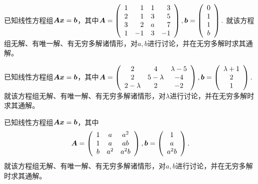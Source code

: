 \begin{frame}\ft{\subsecname}
  
    \begin{li}[2011-2012第二学期]
    已知线性方程组$\boldsymbol{A}{\boldsymbol{x}}={\boldsymbol{b}}$，其中$\boldsymbol{A}=\left(
    \begin{array}{rrrr}
        1&1&1&3\\
        2&1&3&5\\
        3&2&a&7\\
        1&-1&3&-1
      \end{array}
    \right),{\boldsymbol{b}}=\left(
      \begin{array}{c}
        0\\1\\1\\b
      \end{array}
      \right).$
      就该方程组无解、有唯一解、有无穷多解诸情形，对$a,b$进行讨论，并在无穷多解时求其通解。
    \end{li}

    \begin{li}[2012-2013第二学期]
    已知线性方程组$\boldsymbol{A}{\boldsymbol{x}}={\boldsymbol{b}}$，其中$\boldsymbol{A}=\left(
    \begin{array}{ccc}
        2&4&\lambda-5\\
        2&5-\lambda&-4\\
        2-\lambda&2&-2
      \end{array}
    \right),{\boldsymbol{b}}=\left(
      \begin{array}{c}
        \lambda+1\\2\\1
      \end{array}
      \right).$
     就该方程组无解、有唯一解、有无穷多解诸情形，对$\lambda$进行讨论，并在无穷多解时求其通解。         \end{li}


\end{frame}


\begin{frame}\ft{\subsecname}
  
    \begin{li}[2013-2014第一学期]
    已知线性方程组$\boldsymbol{A}{\boldsymbol{x}}={\boldsymbol{b}}$，其中$$\boldsymbol{A}=\left(
    \begin{array}{ccc}
        1&a&a^2\\
        1&a&ab\\
        b&a^2&a^2b
      \end{array}
    \right),{\boldsymbol{b}}=\left(
      \begin{array}{c}
        1\\a\\a^2b
      \end{array}
      \right).$$
     就该方程组无解、有唯一解、有无穷多解诸情形，对$a,b$进行讨论，并在无穷多解时求其通解。    \end{li}

  
\end{frame} 




